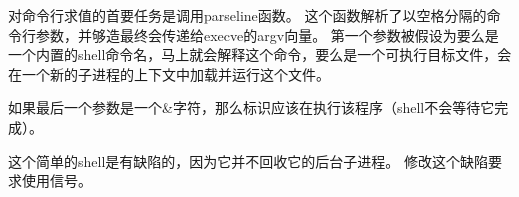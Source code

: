{{        对命令行求值的首要任务是调用parseline函数。
        这个函数解析了以空格分隔的命令行参数，并够造最终会传递给execve的argv向量。
        第一个参数被假设为要么是一个内置的shell命令名，马上就会解释这个命令，要么是一个可执行目标文件，会在一个新的子进程的上下文中加载并运行这个文件。

        如果最后一个参数是一个\&字符，那么标识应该在执行该程序（shell不会等待它完成）。

        这个简单的shell是有缺陷的，因为它并不回收它的后台子进程。
        修改这个缺陷要求使用信号。
    }
}
